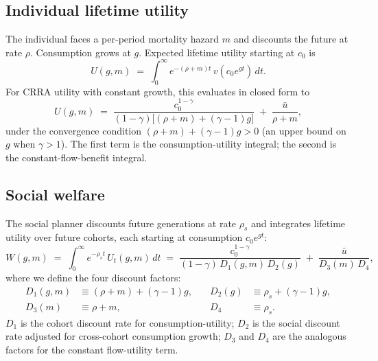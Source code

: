 \documentclass{_latex/house}
\begin{document}
\subsection{Individual lifetime utility}

The individual faces a per-period mortality hazard $m$ and discounts the future at rate $\rho$. Consumption grows at $g$. Expected lifetime utility starting at $c_0$ is
\begin{equation}
U(g, m) \;=\; \int_0^\infty e^{-(\rho+m)t}\, v(c_0 e^{gt})\, dt.
\label{eq:lifetime}
\end{equation}
For CRRA utility with constant growth, this evaluates in closed form to
\begin{equation}
U(g, m) \;=\; \frac{c_0^{1-\gamma}}{(1-\gamma)\bigl[(\rho + m) + (\gamma - 1)g\bigr]} \;+\; \frac{\bar u}{\rho + m},
\label{eq:U}
\end{equation}
under the convergence condition $(\rho + m) + (\gamma - 1)g > 0$ (an upper bound on $g$ when $\gamma > 1$). The first term is the consumption-utility integral; the second is the constant-flow-benefit integral.

\subsection{Social welfare}

The social planner discounts future generations at rate $\rho_s$ and integrates lifetime utility over future cohorts, each starting at consumption $c_0 e^{gt}$:
\begin{equation}
W(g, m) \;=\; \int_0^\infty e^{-\rho_s t}\, U_t(g, m)\, dt
\;=\; \frac{c_0^{1-\gamma}}{(1-\gamma)\, D_1(g,m)\, D_2(g)} \;+\; \frac{\bar u}{D_3(m)\, D_4},
\label{eq:W}
\end{equation}
where we define the four discount factors:
\begin{equation}
\begin{aligned}
D_1(g,m) &\equiv (\rho+m) + (\gamma-1)g, & \quad D_2(g) &\equiv \rho_s + (\gamma-1)g, \\
D_3(m) &\equiv \rho + m, & \quad D_4 &\equiv \rho_s.
\end{aligned}
\label{eq:Ds}
\end{equation}
$D_1$ is the cohort discount rate for consumption-utility; $D_2$ is the social discount rate adjusted for cross-cohort consumption growth; $D_3$ and $D_4$ are the analogous factors for the constant flow-utility term.
\end{document}
